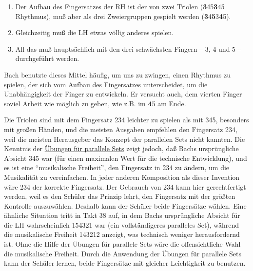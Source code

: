 \begin{enumerate}[label={\roman*.}] 
 \item Der Aufbau des Fingersatzes der RH ist der von zwei Triolen (\textbf{3}45\textbf{3}45 Rhythmus), muß aber als drei Zweiergruppen gespielt werden (\textbf{3}4\textbf{5}3\textbf{4}5).
 \item Gleichzeitig muß die LH etwas völlig anderes spielen.
 \item All das muß hauptsächlich mit den drei schwächsten Fingern -- 3, 4 und 5 -- durchgeführt werden.
\end{enumerate}

Bach benutzte dieses Mittel häufig, um uns zu zwingen, einen Rhythmus zu spielen, der sich vom Aufbau des Fingersatzes unterscheidet, um die Unabhängigkeit der Finger zu entwickeln.
Er versucht auch, dem vierten Finger soviel Arbeit wie möglich zu geben, wie z.B. im \textbf{4}5 am Ende.

Die Triolen sind mit dem Fingersatz 234 leichter zu spielen als mit 345, besonders mit großen Händen, und die meisten Ausgaben empfehlen den Fingersatz 234, weil die meisten Herausgeber das Konzept der parallelen Sets nicht kannten.
Die Kenntnis der \hyperref[c1iii7b]{Übungen für parallele Sets} zeigt jedoch, daß Bachs ursprüngliche Absicht 345 war (für einen maximalen Wert für die technische Entwicklung), und es ist eine \enquote{musikalische Freiheit}, den Fingersatz in 234 zu ändern, um die Musikalität zu vereinfachen.
In jeder anderen Komposition als dieser Invention wäre 234 der korrekte Fingersatz.
Der Gebrauch von 234 kann hier gerechtfertigt werden, weil es den Schüler das Prinzip lehrt, den Fingersatz mit der größten Kontrolle auszuwählen.
Deshalb kann der Schüler beide Fingersätze wählen.
Eine ähnliche Situation tritt in Takt 38 auf, in dem Bachs ursprüngliche Absicht für die LH wahrscheinlich 154321 war (ein vollständigeres paralleles Set), während die musikalische Freiheit 143212 anzeigt, was technisch weniger herausfordernd ist.
Ohne die Hilfe der Übungen für parallele Sets wäre die offensichtliche Wahl die musikalische Freiheit.
Durch die Anwendung der Übungen für parallele Sets kann der Schüler lernen, beide Fingersätze mit gleicher Leichtigkeit zu benutzen.

